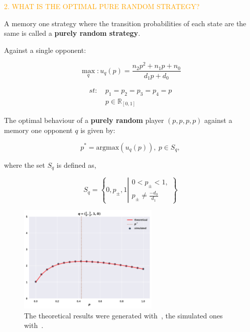 \documentclass[usenames,dvipsnames,t]{beamer}
\newcommand{\R}{\mathbb{R}}
\begin{document}
\begin{columns}
\begin{column}{.45\linewidth}
        \textcolor{orange}{\large{2. WHAT IS THE OPTIMAL PURE RANDOM STRATEGY?}}
        \vspace{0.3cm}

        \small{
        A memory one strategy where the transition probabilities of each
        state are the same is called a \textbf{purely random strategy}.}
        \vspace{0.5cm}

        \textcolor{solarizedGreen}{Against a single opponent:}
        \vspace{0.3cm}

        \[ \max_q: u_q(p) = \frac{n_2p^2 + n_1p +n_0 } {d_1p + d_0}\]
        \vspace{0.3cm}

        \begin{equation*}
            \begin{aligned}
                st: & \ p_1 = p_2 = p_3 = p_4 = p\\
                & \ p \in \R_{[0, 1]} 
            \end{aligned}
        \end{equation*}
        \vspace{0.3cm}

        \small{
        The optimal behaviour of a \textbf{purely random} player \((p, p, p, p)\)
        against a memory one opponent \(q\) is given by:}
        
        \[p^* = \text{argmax}(u_q(p)), \ p \in S_q,\]
        \vspace{0.3cm}

        \small{
        where the set \(S_q\) is defined as,}
        
        \[S_q = \left \{0, p_{\pm}, 1 \left | \begin{array}{l} 0 < p_{\pm} < 1,
            \\ p_{\pm} \neq \frac{-d_0}{d_1} \end{array} \right. \right\}\]
        \vspace{0.5cm}
        
        \begin{center}
            \begin{figure}
            \includegraphics[width=0.6\textwidth]{static/random_vs_one}
            \caption{The theoretical results were generated with~\cite{sympy, numpy},
            the simulated ones with~\cite{axelrod}.}
            \end{figure}
        \end{center}
        \vspace{0.5cm}


\end{column}
\end{columns}
\end{document}
